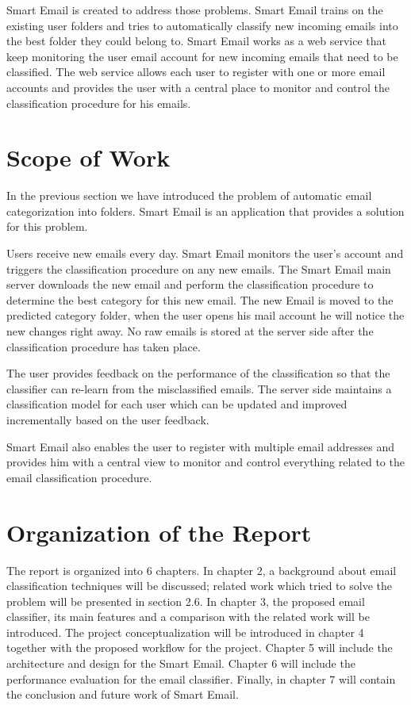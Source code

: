 Smart Email is created to address those problems. Smart Email trains on the 
existing user folders and tries to automatically classify new incoming emails 
into the best folder they could belong to. Smart Email works as a web service 
that keep monitoring the user email account for new incoming emails that need 
to be classified. The web service allows each user to register with one or more 
email accounts and provides the user with a central place to monitor and control 
the classification procedure for his emails.

\section{Scope of Work}

In the previous section we have introduced the problem of automatic email 
categorization into folders. Smart Email is an application that provides 
a solution for this problem.

Users receive new emails every day. Smart Email monitors the user's 
account and triggers the classification procedure on any new emails. 
The Smart Email main server downloads the new email and perform the 
classification procedure to determine the best category for this new 
email. The new Email is moved to the predicted category folder, when the user 
opens his mail account he will notice the new changes right away. No raw emails 
is stored at the server side after the classification procedure has taken place.

The user provides feedback on the performance of the classification so that the 
classifier can re-learn from the misclassified emails. The server side maintains 
a classification model for each user which can be updated and improved incrementally 
based on the user feedback.

Smart Email also enables the user to register with multiple email addresses and 
provides him with a central view to monitor and control everything related to 
the email classification procedure.


\section{Organization of the Report}

The report is organized into 6 chapters. In chapter 2, a background about email 
classification techniques will be discussed; related work which tried to solve 
the problem will be presented in section 2.6. In chapter 3, the proposed email 
classifier, its main features and a comparison with the related work will be 
introduced. The project conceptualization will be introduced in chapter 4 
together with the proposed workflow for the project. Chapter 5 will include the 
architecture and design for the Smart Email. Chapter 6 will include the 
performance evaluation for the email classifier. Finally, in chapter 7 will contain
the conclusion and future work of Smart Email.
